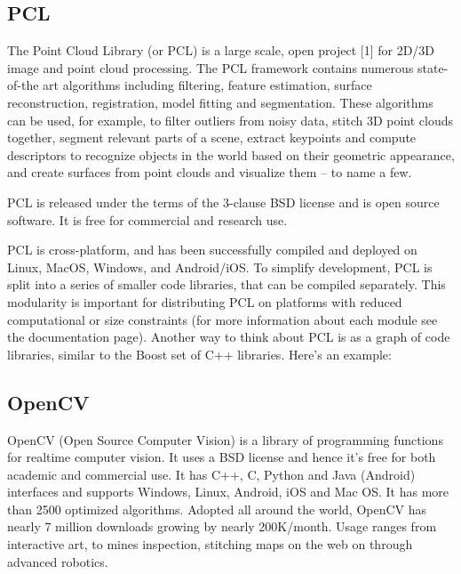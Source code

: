 \subsection{PCL}

 The Point Cloud Library (or PCL) is a large scale, open project [1] for 2D/3D image and point cloud processing. The PCL framework contains numerous state-of-the art algorithms including filtering, feature estimation, surface reconstruction, registration, model fitting and segmentation. These algorithms can be used, for example, to filter outliers from noisy data, stitch 3D point clouds together, segment relevant parts of a scene, extract keypoints and compute descriptors to recognize objects in the world based on their geometric appearance, and create surfaces from point clouds and visualize them -- to name a few.

 

PCL is released under the terms of the 3-clause BSD license and is open source software. It is free for commercial and research use.

PCL is cross-platform, and has been successfully compiled and deployed on Linux, MacOS, Windows, and Android/iOS. To simplify development, PCL is split into a series of smaller code libraries, that can be compiled separately. This modularity is important for distributing PCL on platforms with reduced computational or size constraints (for more information about each module see the documentation page). Another way to think about PCL is as a graph of code libraries, similar to the Boost set of C++ libraries. Here's an example: 
\subsection{OpenCV}
OpenCV (Open Source Computer Vision) is a library of programming functions for realtime computer vision. It uses a BSD license and hence it's free for both academic and commercial use. It has C++, C, Python and Java (Android) interfaces and supports Windows, Linux, Android, iOS and Mac OS. It has more than 2500 optimized algorithms. Adopted all around the world, OpenCV has nearly 7 million downloads growing by nearly 200K/month. Usage ranges from interactive art, to mines inspection, stitching maps on the web on through advanced robotics.






